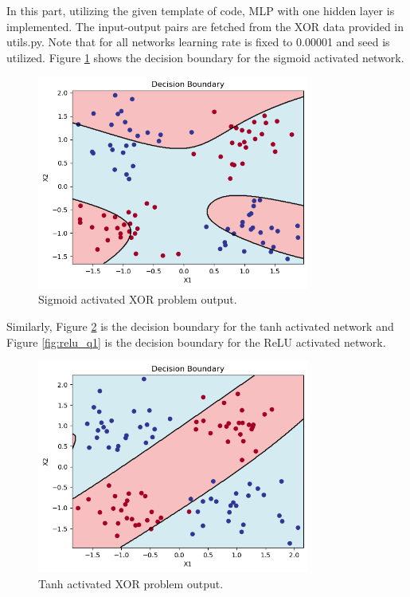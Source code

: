 \documentclass{assignment}
\begin{document}
In this part, utilizing the given template of code, MLP with one hidden layer is implemented. The input-output pairs are fetched from the XOR data provided in utils.py. Note that for all networks learning rate is fixed to 0.00001 and seed is utilized. Figure \ref{fig:sigmoid_q1} shows the decision boundary for the sigmoid activated network. 
\begin{figure}[htbp!]
    \centering
    \includegraphics[width=0.8\textwidth]{figures/q1_sigmoid.png}
    \caption{Sigmoid activated XOR problem output.}
    \label{fig:sigmoid_q1}
\end{figure}
Similarly, Figure \ref{fig:tanh_q1} is the decision boundary for the tanh activated network and Figure \ref{fig:relu_q1} is the decision boundary for the ReLU activated network.


\begin{figure}[htbp!]
    \centering
    \includegraphics[width=0.8\textwidth]{figures/q1_tanh.png}
    \caption{Tanh activated XOR problem output.}
    \label{fig:tanh_q1}
\end{figure}
\end{document}
